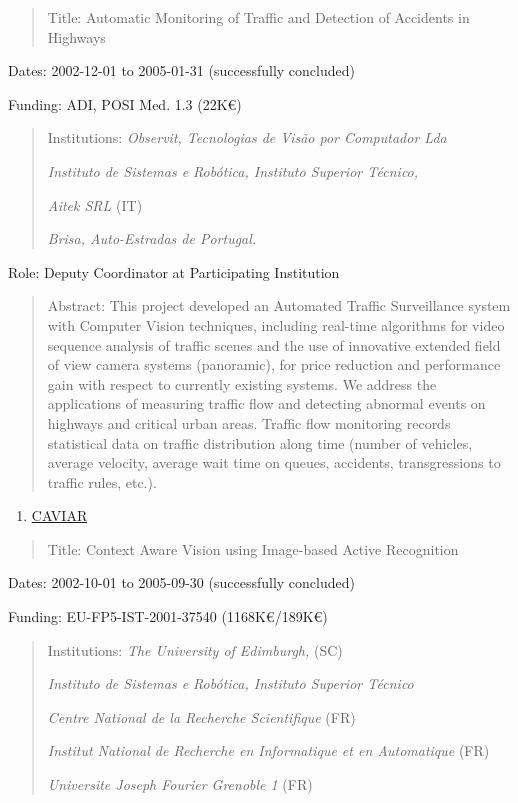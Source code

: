 \begin{quote}
Title: Automatic Monitoring of Traffic and Detection of Accidents in
Highways
\end{quote}

Dates: 2002-12-01 to 2005-01-31 (successfully concluded)

Funding: ADI, POSI Med. 1.3 (22K€)

\begin{quote}
Institutions: \emph{Observit, Tecnologias de Visão por Computador Lda}

\emph{Instituto de Sistemas e Robótica, Instituto Superior Técnico,}

\emph{Aitek SRL} (IT)

\emph{Brisa, Auto-Estradas de Portugal.}
\end{quote}

Role: Deputy Coordinator at Participating Institution

\begin{quote}
Abstract: This project developed an Automated Traffic Surveillance
system with Computer Vision techniques, including real-time algorithms
for video sequence analysis of traffic scenes and the use of innovative
extended field of view camera systems (panoramic), for price reduction
and performance gain with respect to currently existing systems. We
address the applications of measuring traffic flow and detecting
abnormal events on highways and critical urban areas. Traffic flow
monitoring records statistical data on traffic distribution along time
(number of vehicles, average velocity, average wait time on queues,
accidents, transgressions to traffic rules, etc.).
\end{quote}

\begin{enumerate}
\def\labelenumi{\arabic{enumi}.}
\setcounter{enumi}{16}
\item
  \ul{CAVIAR}
\end{enumerate}

\begin{quote}
Title: Context Aware Vision using Image-based Active Recognition
\end{quote}

Dates: 2002-10-01 to 2005-09-30 (successfully concluded)

Funding: EU-FP5-IST-2001-37540 (1168K€/189K€)

\begin{quote}
Institutions: \emph{The University of Edimburgh,} (SC)

\emph{Instituto de Sistemas e Robótica, Instituto Superior Técnico}

\emph{Centre National de la Recherche Scientifique} (FR)

\emph{Institut National de Recherche en Informatique et en Automatique}
(FR)

\emph{Universite Joseph Fourier Grenoble 1} (FR)
\end{quote}

